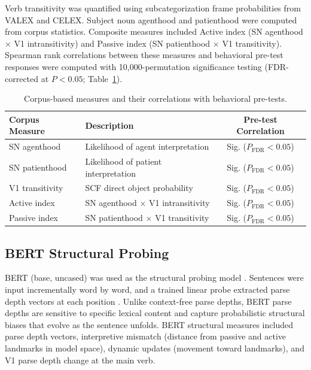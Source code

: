 \documentclass[12pt]{article}
\begin{document}
Verb transitivity was quantified using subcategorization frame probabilities from VALEX and CELEX. Subject noun agenthood and patienthood were computed from corpus statistics. Composite measures included Active index (SN agenthood $\times$ V1 intransitivity) and Passive index (SN patienthood $\times$ V1 transitivity). Spearman rank correlations between these measures and behavioral pre-test responses were computed with 10,000-permutation significance testing (FDR-corrected at $P < 0.05$; Table~\ref{tab:corpus}).

\begin{table}[htbp]
\centering
\caption{Corpus-based measures and their correlations with behavioral pre-tests.}
\label{tab:corpus}
\begin{tabular}{llc}
\toprule
Corpus Measure & Description & Pre-test Correlation \\
\midrule
SN agenthood & Likelihood of agent interpretation & Sig. ($P_{\textrm{FDR}} < 0.05$) \\
SN patienthood & Likelihood of patient interpretation & Sig. ($P_{\textrm{FDR}} < 0.05$) \\
V1 transitivity & SCF direct object probability & Sig. ($P_{\textrm{FDR}} < 0.05$) \\
Active index & SN agenthood $\times$ V1 intransitivity & Sig. ($P_{\textrm{FDR}} < 0.05$) \\
Passive index & SN patienthood $\times$ V1 transitivity & Sig. ($P_{\textrm{FDR}} < 0.05$) \\
\bottomrule
\end{tabular}
\end{table}

\subsection{BERT Structural Probing}

BERT (base, uncased) was used as the structural probing model \citep{devlin2019bert}. Sentences were input incrementally word by word, and a trained linear probe extracted parse depth vectors at each position \citep{hewitt2019structural, demarneffe2006generating}. Unlike context-free parse depths, BERT parse depths are sensitive to specific lexical content and capture probabilistic structural biases that evolve as the sentence unfolds. BERT structural measures included parse depth vectors, interpretive mismatch (distance from passive and active landmarks in model space), dynamic updates (movement toward landmarks), and V1 parse depth change at the main verb.
\end{document}
